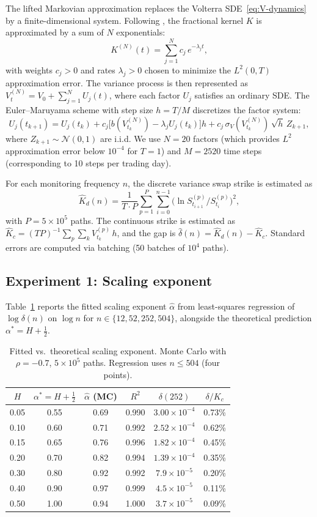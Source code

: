 \documentclass[12pt]{article}
\theoremstyle{definition}
\begin{document}
The lifted Markovian approximation replaces the Volterra
SDE~\eqref{eq:V-dynamics} by a finite-dimensional system.
Following \citet{AbiJaberElEuch2019}, the fractional kernel $K$ is
approximated by a sum of $N$ exponentials:
\[
  K^{(N)}(t) = \sum_{j=1}^{N} c_j\, e^{-\lambda_j t},
\]
with weights $c_j > 0$ and rates $\lambda_j > 0$ chosen to minimize
the $L^2(0,T)$ approximation error.
The variance process is then represented as $V_t^{(N)} = V_0 +
\sum_{j=1}^N U_j(t)$, where each factor $U_j$ satisfies an
ordinary SDE.
The Euler--Maruyama scheme with step size $h = T/M$ discretizes
the factor system:
\[
  U_j(t_{k+1}) = U_j(t_k)
  + c_j\bigl[b(V_{t_k}^{(N)}) - \lambda_j U_j(t_k)\bigr]h
  + c_j\,\sigma_V(V_{t_k}^{(N)})\,\sqrt{h}\,Z_{k+1},
\]
where $Z_{k+1} \sim \mathcal{N}(0,1)$ are i.i.d.
We use $N = 20$ factors (which provides $L^2$ approximation error
below $10^{-4}$ for $T = 1$) and $M = 2520$ time steps
(corresponding to 10 steps per trading day).

For each monitoring frequency $n$, the discrete variance swap
strike is estimated as
\[
  \hat K_d(n) = \frac{1}{T \cdot P}\sum_{p=1}^{P}
  \sum_{i=0}^{n-1} \bigl(\ln S_{t_{i+1}}^{(p)} / S_{t_i}^{(p)}\bigr)^2,
\]
with $P = 5 \times 10^5$ paths.
The continuous strike is estimated as
$\hat K_c = (TP)^{-1}\sum_p \sum_k V_{t_k}^{(p)}\,h$,
and the gap is $\hat\delta(n) = \hat K_d(n) - \hat K_c$.
Standard errors are computed via batching (50 batches of $10^4$ paths).

\subsection{Experiment 1: Scaling exponent}\label{sec:exp1}

Table~\ref{tab:alpha} reports the fitted scaling exponent
$\hat\alpha$ from least-squares regression of
$\log\delta(n)$ on $\log n$ for $n \in \{12, 52, 252, 504\}$,
alongside the theoretical prediction $\alpha^* = H + \tfrac12$.

\begin{table}[htbp]
\centering
\caption{Fitted vs.\ theoretical scaling exponent.
Monte Carlo with $\rho = -0.7$, $5\times10^5$ paths.
Regression uses $n \le 504$ (four points).}
\label{tab:alpha}
\begin{tabular}{cccccc}
\toprule
$H$ & $\alpha^* = H{+}\tfrac12$ & $\hat\alpha$ (MC)
& $R^2$ & $\delta(252)$ & $\delta/K_c$ \\
\midrule
0.05 & 0.55 & 0.69 & 0.990 & $3.00 \times 10^{-4}$ & 0.73\% \\
0.10 & 0.60 & 0.71 & 0.992 & $2.52 \times 10^{-4}$ & 0.62\% \\
0.15 & 0.65 & 0.76 & 0.996 & $1.82 \times 10^{-4}$ & 0.45\% \\
0.20 & 0.70 & 0.82 & 0.994 & $1.39 \times 10^{-4}$ & 0.35\% \\
0.30 & 0.80 & 0.92 & 0.992 & $7.9 \times 10^{-5}$ & 0.20\% \\
0.40 & 0.90 & 0.97 & 0.999 & $4.5 \times 10^{-5}$ & 0.11\% \\
0.50 & 1.00 & 0.94 & 1.000 & $3.7 \times 10^{-5}$ & 0.09\% \\
\bottomrule
\end{tabular}
\end{table}
\end{document}
